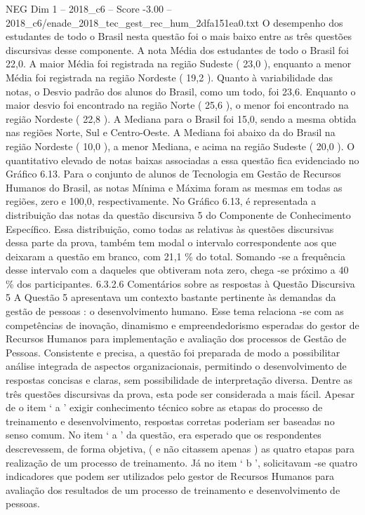 \begin{textsample}{NEG Dim 1 – 2018\_c6 – Score -3.00 – 2018\_c6/enade\_2018\_tec\_gest\_rec\_hum\_2dfa151ea0.txt}
O desempenho dos estudantes de todo o Brasil nesta questão foi o mais baixo entre as três questões discursivas desse componente.
A nota Média dos estudantes de todo o Brasil foi 22,0.
A maior Média foi registrada na região Sudeste ( 23,0 ), enquanto a menor Média foi registrada na região Nordeste ( 19,2 ).
Quanto à variabilidade das notas, o Desvio padrão dos alunos do Brasil, como um todo, foi 23,6.
Enquanto o maior desvio foi encontrado na região Norte ( 25,6 ), o menor foi encontrado na região Nordeste ( 22,8 ).
A Mediana para o Brasil foi 15,0, sendo a mesma obtida nas regiões Norte, Sul e Centro-Oeste.
A Mediana foi abaixo da do Brasil na região Nordeste ( 10,0 ), a menor Mediana, e acima na região Sudeste ( 20,0 ).
O quantitativo elevado de notas baixas associadas a essa questão fica evidenciado no Gráfico 6.13.
Para o conjunto de alunos de Tecnologia em Gestão de Recursos Humanos do Brasil, as notas Mínima e Máxima foram as mesmas em todas as regiões, zero e 100,0, respectivamente.
No Gráfico 6.13, é representada a distribuição das notas da questão discursiva 5 do Componente de Conhecimento Específico.
Essa distribuição, como todas as relativas às questões discursivas dessa parte da prova, também tem modal o intervalo correspondente aos que deixaram a questão em branco, com 21,1 \% do total.
Somando -se a frequência desse intervalo com a daqueles que obtiveram nota zero, chega -se próximo a 40 \% dos participantes. 6.3.2.6 Comentários sobre as respostas à Questão Discursiva 5 A Questão 5 apresentava um contexto bastante pertinente às demandas da gestão de pessoas : o desenvolvimento humano.
Esse tema relaciona -se com as competências de inovação, dinamismo e empreendedorismo esperadas do gestor de Recursos Humanos para implementação e avaliação dos processos de Gestão de Pessoas.
Consistente e precisa, a questão foi preparada de modo a possibilitar análise integrada de aspectos organizacionais, permitindo o desenvolvimento de respostas concisas e claras, sem possibilidade de interpretação diversa.
Dentre as três questões discursivas da prova, esta pode ser considerada a mais fácil.
Apesar de o item ‘ a ’ exigir conhecimento técnico sobre as etapas do processo de treinamento e desenvolvimento, respostas corretas poderiam ser baseadas no senso comum.
No item ‘ a ’ da questão, era esperado que os respondentes descrevessem, de forma objetiva, ( e não citassem apenas ) as quatro etapas para realização de um processo de treinamento.
Já no item ‘ b ’, solicitavam -se quatro indicadores que podem ser utilizados pelo gestor de Recursos Humanos para avaliação dos resultados de um processo de treinamento e desenvolvimento de pessoas.

\end{textsample}
